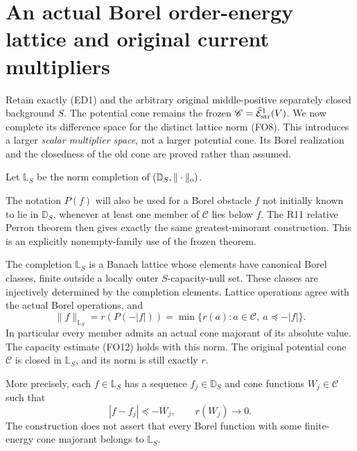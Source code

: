 \section{An actual Borel order-energy lattice and original current multipliers}
\label{sec:r12-order-energy-lattice}

Retain exactly \textup{(ED1)} and the arbitrary original
middle-positive separately closed background $S$.  The
potential cone remains the frozen
$\mathscr C=\widehat{\mathcal E}^1_{\rm str}(V)$.
We now complete its difference space for the distinct lattice
norm \textup{(FO8)}.  This introduces a larger \emph{scalar
multiplier space}, not a larger potential cone.  Its Borel
realization and the closedness of the old cone are proved
rather than assumed.

\begin{definition}
\label{def:r12-order-energy-lattice}
Let $\mathbb L_S$ be the norm completion of
$(\mathbb D_S,\|\cdot\|_{\rm o})$.
\end{definition}

The notation $P(f)$ will also be used for a Borel obstacle
$f$ not initially known to lie in $\mathbb D_S$, whenever
at least one member of $\mathscr C$ lies below $f$.
The R11 relative Perron theorem then gives exactly the same
greatest-minorant construction.  This is an explicitly
nonempty-family use of the frozen theorem.

\begin{theorem}
\label{thm:r12-Borel-order-lattice}
The completion $\mathbb L_S$ is a Banach lattice whose
elements have canonical Borel classes, finite outside a
locally outer $S$-capacity-null set.  These classes are
injectively determined by the completion elements.  Lattice
operations agree with the actual Borel operations, and
\[
 \boxed{\qquad
 \|f\|_{\mathbb L_S}
    =r(P(-|f|))
    =\min\{r(a):a\in\mathscr C,\ a\preceq-|f|\}.
 \qquad}
 \tag{OL1}
\]
In particular every member admits an actual cone majorant
of its absolute value.  The capacity estimate
\textup{(FO12)} holds with this norm.  The original potential
cone $\mathscr C$ is closed in $\mathbb L_S$, and its norm
is still exactly $r$.

More precisely, each $f\in\mathbb L_S$ has a sequence
$f_j\in\mathbb D_S$ and cone functions $W_j\in\mathscr C$
such that
\[
 |f-f_j|\preceq-W_j,\qquad r(W_j)\longrightarrow0.
 \tag{OL2}
\]
The construction does not assert that every Borel function
with some finite-energy cone majorant belongs to $\mathbb L_S$.
\end{theorem}

